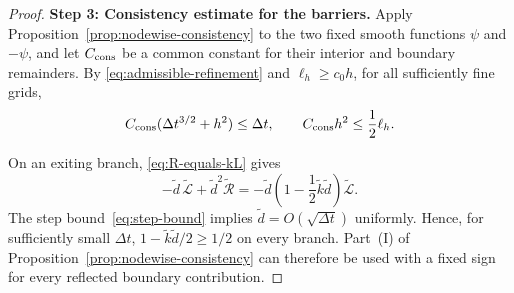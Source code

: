 \documentclass[11pt]{article}
\theoremstyle{definition}
\theoremstyle{remark}
\begin{document}
\begin{proof}
		\medskip
		\noindent\textbf{Step 3: Consistency estimate for the barriers.}
		Apply Proposition~\ref{prop:nodewise-consistency} to the two fixed smooth
		functions $\psi$ and $-\psi$, and let $C_{\rm cons}$ be a common constant
		for their interior and boundary remainders.  By
		\eqref{eq:admissible-refinement} and $\ell_h\ge c_0h$, for all sufficiently
		fine grids,
		\begin{equation}
			C_{\rm cons}(\Delta t^{3/2}+h^2)\le\Delta t,
			\qquad C_{\rm cons}h^2\le\frac12\ell_h.
			\label{eq:barrier-remainder}
		\end{equation}
		
		On an exiting branch,
		\eqref{eq:R-equals-kL} gives
		\[
		-\widetilde d\,\widetilde{\mathcal L}
		+\widetilde d^2\widetilde{\mathcal R}
		=-\widetilde d\left(1-\frac12\widetilde k\widetilde d\right)
		\widetilde{\mathcal L}.
		\]
		The step bound~\eqref{eq:step-bound} implies
		$\widetilde d=O(\sqrt{\Delta t})$ uniformly.  Hence, for sufficiently small
		$\Delta t$,
		\(
		1-\widetilde k\widetilde d/2\ge1/2
		\)
		on every branch.  Part~\textup{(I)} of
		Proposition~\ref{prop:nodewise-consistency} can therefore be used with a
		fixed sign for every reflected boundary contribution.
		

\end{proof}
\end{document}
